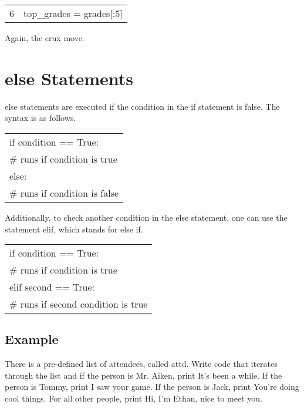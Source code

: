 \documentclass{article}
\newcommand{\icode}[1]{{\ttfamily #1}}
\newenvironment{code}{\begin{tcolorbox}\ttfamily}{\end{tcolorbox}}
\begin{document}
\begin{code}
	\begin{tabular}{l|l}
		6& top\_grades = grades[:5]
	\end{tabular}
\end{code}
Again, the crux move.


\section{\icode{else} Statements}
\icode{else} statements are executed if the condition in the \icode{if} statement is false. The syntax is as follows.

\begin{center} \ttfamily
	\begin{tabular}{|l}
		if condition == True:\\
		\hspace{2 em}\# runs if condition is true\\
		else:\\
		\hspace{2 em}\# runs if condition is false
	\end{tabular}
\end{center}
Additionally, to check another condition in the else statement, one can use the statement \icode{elif}, which stands for else if.

\begin{center} \ttfamily
	\begin{tabular}{|l}
		if condition == True:\\
		\hspace{2 em}\# runs if condition is true\\
		elif second == True:\\
		\hspace{2 em}\# runs if second condition is true
	\end{tabular}
\end{center}

\subsection{Example}
There is a pre-defined list of attendees, called \icode{attd}. Write code that iterates through the list and if the person is Mr. Aiken, print \icode{It's been a while.} If the person is Tommy, print \icode{I saw your game}. If the person is Jack, print \icode{You're doing cool things}. For all other people, print \icode{Hi, I'm Ethan, nice to meet you.}
\end{document}
